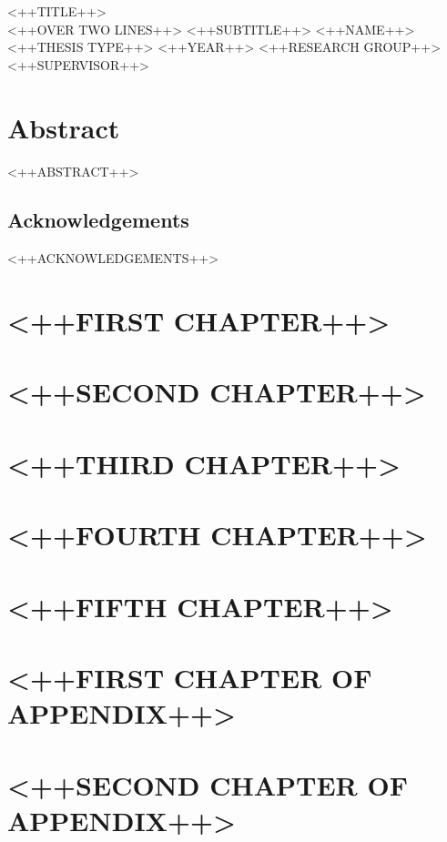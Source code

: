 \documentclass[10pt]{book}
\begin{document}
\frontmatter
\studtitlepage%
{<++TITLE++> \\[.1em]
<++OVER TWO LINES++>}%
{<++SUBTITLE++>}%
{<++NAME++>}%
{<++THESIS TYPE++>}%
{<++YEAR++>}%
{<++RESEARCH GROUP++>}%
{<++SUPERVISOR++>}
\cleardoublepage
\eidesstatt
{}

\chapter*{Abstract}
<++ABSTRACT++>

\section*{Acknowledgements}
<++ACKNOWLEDGEMENTS++>

\tableofcontents
\listoffigures
\listoftables
\mainmatter

\chapter{<++FIRST CHAPTER++>}
\chapter{<++SECOND CHAPTER++>}
\chapter{<++THIRD CHAPTER++>}
\chapter{<++FOURTH CHAPTER++>}
\chapter{<++FIFTH CHAPTER++>}

\appendix
\chapter{<++FIRST CHAPTER OF APPENDIX++>}
\chapter{<++SECOND CHAPTER OF APPENDIX++>}

\backmatter
\tocbibliography
\end{document}
